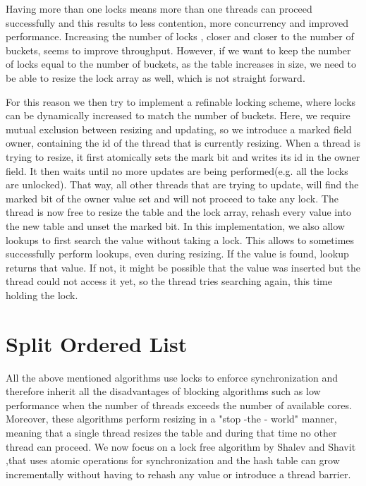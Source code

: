 
Having more than one locks means more than one threads can proceed  successfully and this results to less contention, more concurrency and improved performance. Increasing the number of locks , closer and closer to the number of buckets, seems to improve throughput. However, if we want to keep the number of locks equal to the number of buckets, as the table increases in size, we need to be able to resize the lock array as well, which is not straight forward.

For this reason we then try to implement a refinable locking scheme, where locks can be dynamically increased to match the number of buckets. Here, we require mutual exclusion between resizing and updating, so we introduce a marked field owner, containing the id of the thread that is currently resizing. When a thread is trying to resize, it first atomically sets the mark bit and writes its id in the owner field. It then waits until no more updates are being performed(e.g. all the locks are unlocked). That way, all other threads that are trying to update, will find the marked bit of the owner value set and will not proceed to take any lock. The thread is now free to resize the table and the lock array, rehash every value into the new table and unset the marked bit. In this implementation, we also allow lookups to first search the value without taking a lock. This allows to sometimes successfully perform lookups, even during resizing. If the value is found, lookup returns that value. If not, it might be possible that the value was inserted but the thread could not access it yet, so the thread tries searching again, this time holding the lock. 


\section { Split Ordered List}

All the above mentioned algorithms use locks to enforce synchronization and therefore inherit all the disadvantages of blocking algorithms such as low performance when the number of threads exceeds the number of available cores. Moreover, these algorithms perform resizing in a "stop -the - world" manner, meaning that a single thread resizes the table and during that time no other thread can proceed. We now focus on a lock free algorithm  by  Shalev and Shavit  \cite{split_ordered} ,that uses atomic operations for synchronization and the hash table can grow incrementally without having to rehash any value or introduce a thread barrier.


